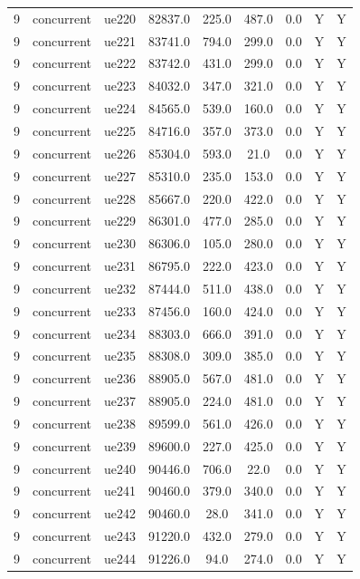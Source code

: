 \begin{table}[ht]
\begin{tabular}{|c|c|c|c|c|c|c|c|c|}
9 & concurrent & ue220 & 82837.0 & 225.0 & 487.0 & 0.0 & Y & Y \\
9 & concurrent & ue221 & 83741.0 & 794.0 & 299.0 & 0.0 & Y & Y \\
9 & concurrent & ue222 & 83742.0 & 431.0 & 299.0 & 0.0 & Y & Y \\
9 & concurrent & ue223 & 84032.0 & 347.0 & 321.0 & 0.0 & Y & Y \\
9 & concurrent & ue224 & 84565.0 & 539.0 & 160.0 & 0.0 & Y & Y \\
9 & concurrent & ue225 & 84716.0 & 357.0 & 373.0 & 0.0 & Y & Y \\
9 & concurrent & ue226 & 85304.0 & 593.0 & 21.0 & 0.0 & Y & Y \\
9 & concurrent & ue227 & 85310.0 & 235.0 & 153.0 & 0.0 & Y & Y \\
9 & concurrent & ue228 & 85667.0 & 220.0 & 422.0 & 0.0 & Y & Y \\
9 & concurrent & ue229 & 86301.0 & 477.0 & 285.0 & 0.0 & Y & Y \\
9 & concurrent & ue230 & 86306.0 & 105.0 & 280.0 & 0.0 & Y & Y \\
9 & concurrent & ue231 & 86795.0 & 222.0 & 423.0 & 0.0 & Y & Y \\
9 & concurrent & ue232 & 87444.0 & 511.0 & 438.0 & 0.0 & Y & Y \\
9 & concurrent & ue233 & 87456.0 & 160.0 & 424.0 & 0.0 & Y & Y \\
9 & concurrent & ue234 & 88303.0 & 666.0 & 391.0 & 0.0 & Y & Y \\
9 & concurrent & ue235 & 88308.0 & 309.0 & 385.0 & 0.0 & Y & Y \\
9 & concurrent & ue236 & 88905.0 & 567.0 & 481.0 & 0.0 & Y & Y \\
9 & concurrent & ue237 & 88905.0 & 224.0 & 481.0 & 0.0 & Y & Y \\
9 & concurrent & ue238 & 89599.0 & 561.0 & 426.0 & 0.0 & Y & Y \\
9 & concurrent & ue239 & 89600.0 & 227.0 & 425.0 & 0.0 & Y & Y \\
9 & concurrent & ue240 & 90446.0 & 706.0 & 22.0 & 0.0 & Y & Y \\
9 & concurrent & ue241 & 90460.0 & 379.0 & 340.0 & 0.0 & Y & Y \\
9 & concurrent & ue242 & 90460.0 & 28.0 & 341.0 & 0.0 & Y & Y \\
9 & concurrent & ue243 & 91220.0 & 432.0 & 279.0 & 0.0 & Y & Y \\
9 & concurrent & ue244 & 91226.0 & 94.0 & 274.0 & 0.0 & Y & Y \\

\end{tabular}
\end{table}
